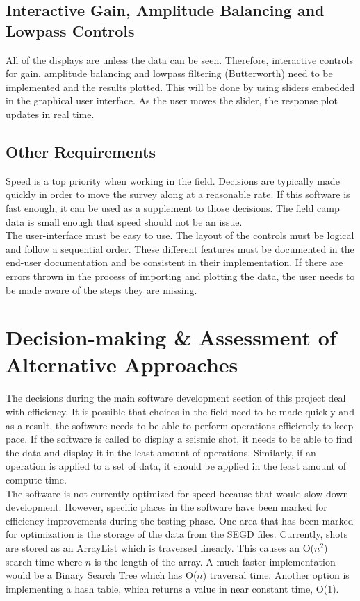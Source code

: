 \documentclass[12pt]{article}
\begin{document}
\subsection{Interactive Gain, Amplitude Balancing and Lowpass Controls}

All of the displays are unless the data can be seen. Therefore, interactive controls for gain, amplitude balancing and lowpass filtering (Butterworth) need to be implemented and the results plotted. This will be done by using sliders embedded in the graphical user interface. As the user moves the slider, the response plot updates in real time.

\subsection{Other Requirements}

Speed is a top priority when working in the field. Decisions are typically made quickly in order to move the survey along at a reasonable rate. If this software is fast enough, it can be used as a supplement to those decisions. The field camp data is small enough that speed should not be an issue. \\

The user-interface must be easy to use. The layout of the controls must be logical and follow a sequential order. These different features must be documented in the end-user documentation and be consistent in their implementation. If there are errors thrown in the process of importing and plotting the data, the user needs to be made aware of the steps they are missing.

\section{Decision-making \& Assessment of Alternative Approaches}

The decisions during the main software development section of this project deal with efficiency. It is possible that choices in the field need to be made quickly and as a result, the software needs to be able to perform operations efficiently to keep pace. If the software is called to display a seismic shot, it needs to be able to find the data and display it in the least amount of operations. Similarly, if an operation is applied to a set of data, it should be applied in the least amount of compute time. \\

The software is not currently optimized for speed because that would slow down development. However, specific places in the software have been marked for efficiency improvements during the testing phase. One area that has been marked for optimization is the storage of the data from the SEGD files. Currently, shots are stored as an ArrayList which is traversed linearly. This causes an O($n^2$) search time where $n$ is the length of the array. A much faster implementation would be a Binary Search Tree which has O($n$) traversal time. Another option is implementing a hash table, which returns a value in near constant time, O($1$). \\
\end{document}
